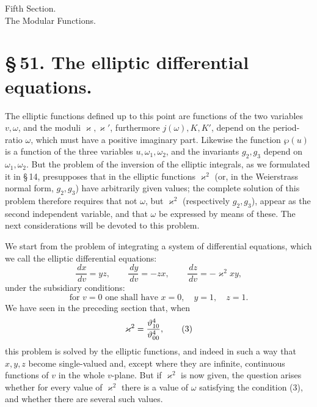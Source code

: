 \documentclass[11pt]{article}
\providecommand{\dd}{\,d}
\providecommand{\tht}{\vartheta}
\begin{document}
\begin{center}
{\large Fifth Section.}\\[0.7em]
{\Large The Modular Functions.}
\end{center}

\section*{\S\,51. The elliptic differential equations.}

The elliptic functions defined up to this point are functions of the two variables $v,\omega$, and the moduli $\varkappa,\varkappa'$, furthermore $j(\omega),K,K'$, depend on the period-ratio $\omega$, which must have a positive imaginary part. Likewise the function $\wp(u)$ is a function of the three variables $u,\omega_1,\omega_2$, and the invariants $g_2,g_3$ depend on $\omega_1,\omega_2$. But the problem of the inversion of the elliptic integrals, as we formulated it in \S\,14, presupposes that in the elliptic functions $\varkappa^2$ (or, in the Weierstrass normal form, $g_2,g_3$) have arbitrarily given values; the complete solution of this problem therefore requires that not $\omega$, but $\varkappa^2$ (respectively $g_2,g_3$), appear as the second independent variable, and that $\omega$ be expressed by means of these. The next considerations will be devoted to this problem.

We start from the problem of integrating a system of differential equations, which we call the elliptic differential equations:
\begin{equation}
\frac{\dd x}{\dd v}=yz,\qquad
\frac{\dd y}{\dd v}=-zx,\qquad
\frac{\dd z}{\dd v}=-\varkappa^2xy,
\tag{1}
\end{equation}
under the subsidiary conditions:
\begin{equation}
\text{for }v=0\text{ one shall have }x=0,
\quad y=1,
\quad z=1.
\tag{2}
\end{equation}
We have seen in the preceding section that, when
\begin{equation}
\varkappa^2={\tht_{10}^4\over\tht_{00}^4},
\tag{3}
\end{equation}
this problem is solved by the elliptic functions, and indeed in such a way that $x,y,z$ become single-valued and, except where they are infinite, continuous functions of $v$ in the whole $v$-plane. But if $\varkappa^2$ is now given, the question arises whether for every value of $\varkappa^2$ there is a value of $\omega$ satisfying the condition (3), and whether there are several such values.
\end{document}
